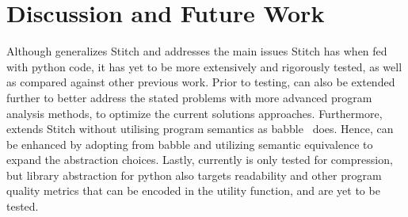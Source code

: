 \section{Discussion and Future Work}
\label{sec:conc}

Although \toolname generalizes Stitch \cite{Bowers_2023stitch} and addresses 
the main issues Stitch has when fed with python code, it has yet to be more extensively and rigorously tested, 
as well as compared against other previous work. Prior to testing, \toolname can also be extended further to better address 
the stated problems with more advanced program analysis methods, to optimize the current solutions approaches. Furthermore, \toolname extends Stitch without utilising program semantics as babble~\cite{Cao_2023babble} does. Hence, \toolname can be enhanced by adopting from babble and utilizing semantic equivalence to expand the abstraction choices. Lastly, currently \toolname is only tested for compression, but library abstraction for python also targets readability and other program quality metrics that can be encoded in the utility function, and are yet to be tested. 







